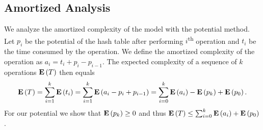 \subsection{Amortized Analysis}
We analyze the amortized complexity of the model with the potential method. 
Let $p_i$ be the potential of the hash table after performing $i$\textsuperscript{th} operation and $t_i$ be the time consumed by the operation. 
We define the amortized complexity of the operation as $a_i = t_i + p_i - p_{i - 1}$. 
The expected complexity of a sequence of $k$ operations $\mathbf{E}\left(T\right)$ then equals
\[
\mathbf{E}\left(T\right) = \sum_{i=1}^{k} \mathbf{E}\left(t_i\right) = \sum_{i = 1}^{k} \mathbf{E}\left(a_i - p_i + p_{i - 1}\right) = \sum_{i=0}^{k} \mathbf{E}\left(a_i\right) - \mathbf{E}\left(p_k\right) + \mathbf{E}\left(p_0\right).
\]
For our potential we show that $\mathbf{E}\left(p_k\right) \geq 0$ and thus $\mathbf{E}\left(T\right) \leq \sum_{i=0}^{k} \mathbf{E}\left(a_i\right) + \mathbf{E}\left(p_0\right)$.


